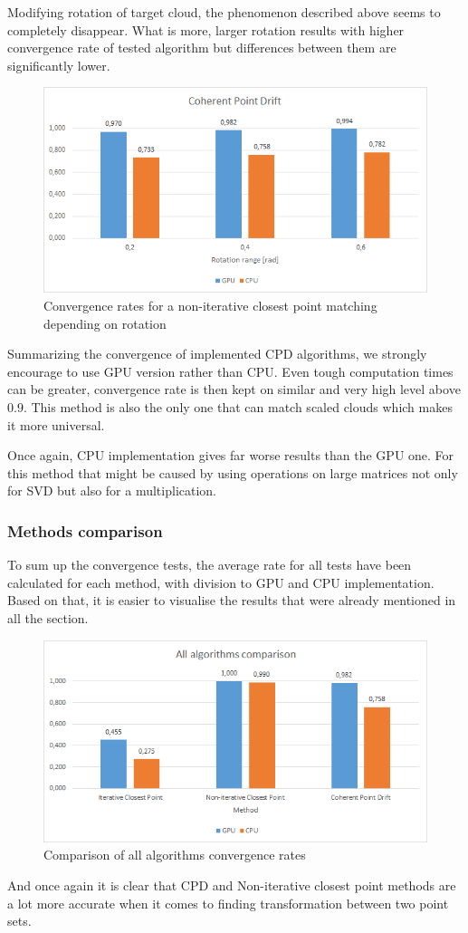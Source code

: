 \documentclass[titlepage]{article}
\begin{document}
Modifying rotation of target cloud, the phenomenon described above seems to completely disappear. What is more, larger rotation results with higher convergence rate of tested algorithm but differences between them are significantly lower.
\begin{figure}[H]
\includegraphics[width=\textwidth]{ss-cpd-3.png}
\caption{Convergence rates for a non-iterative closest point matching depending on rotation}
\end{figure}
Summarizing the convergence of implemented CPD algorithms, we strongly encourage to use GPU version rather than CPU. Even tough computation times can be greater, convergence rate is then kept on similar and very high level above 0.9. This method is also the only one that can match scaled clouds which makes it more universal. 

Once again, CPU implementation gives far worse results than the GPU one. For this method that might be caused by using operations on large matrices not only for SVD but also for a multiplication.

\subsubsection{Methods comparison}
To sum up the convergence tests, the average rate for all tests have been calculated for each method, with division to GPU and CPU implementation. Based on that, it is easier to visualise the results that were already mentioned in all the section. 
\begin{figure}[H]
\includegraphics[width=\textwidth]{ss-all.png}
\caption{Comparison of all algorithms convergence rates}
\end{figure}
And once again it is clear that CPD and Non-iterative closest point methods are a lot more accurate when it comes to finding transformation between two point sets.
\end{document}
